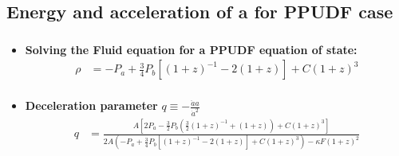 \documentclass[8pt,hideothersubsections]{beamer}
\newcommand{\brac}[1]{\left(#1\right)}
\newcommand{\bracc}[1]{\left[#1\right]}
\begin{document}
{\subsection{Energy and acceleration of a for PPUDF case}
\begin{frame}
\frametitle{\insertsubsectionhead}
\fontsize{8pt}{7.2}\selectfont
\begin{itemize}
\item \textbf{Solving the Fluid equation for a PPUDF equation of state:}
\begin{equation}\label{eq:UDFFluidSolZ}
\begin{split}
\rho&= -P_{a}+\frac{3}{4}P_{b}\bracc{\brac{1+z}^{-1}-2\brac{1+z}}+C\brac{1+z}^{3} \\
\end{split}
\end{equation}
\fontsize{8pt}{7.2}\selectfont
\item \textbf{Deceleration parameter} $q\equiv-\frac{\ddot{a}a}{\dot{a}^{2}}$
\fontsize{6pt}{7.2}\selectfont
\begin{equation}\label{eq:UDFq}
\begin{split}
q &= \frac{A\bracc{2P_{a}-\frac{3}{2}P_{b}\brac{\frac{3}{2}\brac{1+z}^{-1}+\brac{1+z}}+C\brac{1+z}^{3}}}{2A\brac{-P_{a}+\frac{3}{4}P_{b}\bracc{\brac{1+z}^{-1}-2\brac{1+z}}+C\brac{1+z}^{3}} -\kappa F \brac{1+z}^{2}}       \\
\end{split}
\end{equation}
\end{itemize}


\end{frame}}
\end{document}
